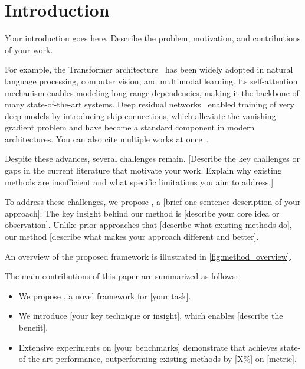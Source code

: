 \section{Introduction}
\label{sec:introduction}

Your introduction goes here. Describe the problem, motivation, and contributions of your work.

For example, the Transformer architecture~\cite{vaswani2017attention} has been widely adopted in natural language processing, computer vision, and multimodal learning. Its self-attention mechanism enables modeling long-range dependencies, making it the backbone of many state-of-the-art systems. Deep residual networks~\cite{he2016deep} enabled training of very deep models by introducing skip connections, which alleviate the vanishing gradient problem and have become a standard component in modern architectures. You can also cite multiple works at once~\cite{devlin2019bert,goodfellow2014generative,kingma2014adam}.

Despite these advances, several challenges remain. [Describe the key challenges or gaps in the current literature that motivate your work. Explain why existing methods are insufficient and what specific limitations you aim to address.]

To address these challenges, we propose \method, a [brief one-sentence description of your approach]. The key insight behind our method is [describe your core idea or observation]. Unlike prior approaches that [describe what existing methods do], our method [describe what makes your approach different and better].

An overview of the proposed framework is illustrated in \cref{fig:method_overview}.

The main contributions of this paper are summarized as follows:
\begin{itemize}[leftmargin=2em,itemsep=2pt,topsep=2pt]
  \item We propose \method, a novel framework for [your task].
  \item We introduce [your key technique or insight], which enables [describe the benefit].
  \item Extensive experiments on [your benchmarks] demonstrate that \method achieves state-of-the-art performance, outperforming existing methods by [X\%] on [metric].
\end{itemize}
